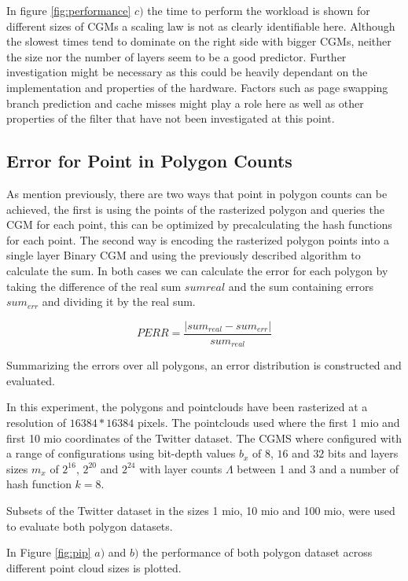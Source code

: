 \documentclass[sigconf, nonacm]{acmart}
\begin{document}
In figure \ref{fig:performance} $c)$ the time to perform the workload is shown for different sizes of CGMs a scaling law is not as clearly identifiable here. Although the slowest times tend to dominate on the right side with bigger CGMs, neither the size nor the number of layers seem to be a good predictor. Further investigation might be necessary as this could be heavily dependant on the implementation and properties of the hardware. Factors such as page swapping branch prediction and cache misses might play a role here as well as other properties of the filter that have not been investigated at this point.




\subsection{Error for Point in Polygon Counts}
\label{error-for-point-in-polygon-counts}

As mention previously, there are two ways that point in polygon counts can be achieved, the first is using the points of the rasterized polygon and queries the CGM for each point, this can be optimized by precalculating the hash functions for each point. The second way is encoding the rasterized polygon points into a single layer Binary CGM and using the previously described algorithm to calculate the sum. In both cases we can calculate the error for each polygon by taking the difference of the real sum $sum{real}$ and the sum containing errors
$sum_{err}$ and dividing it by the real sum.

$$PERR = \frac{|sum_{real} - sum_{err}|}{sum_{real }}$$

Summarizing the errors over all polygons, an error distribution is constructed and evaluated.

In this experiment, the polygons and pointclouds have been rasterized at a resolution of $16384*16384$ pixels. The pointclouds used where the first 1 mio and first 10 mio coordinates of the Twitter dataset. The CGMS where configured with a range of configurations using bit-depth values $b_x$ of $8$, $16$ and $32$ bits and layers sizes $m_x$ of $2^{16}$, $2^{20}$ and $2^{24}$ with layer counts $\Lambda$ between 1 and 3 and a number of hash function $k=8$.

Subsets of the Twitter dataset in the sizes 1 mio, 10 mio and 100 mio, were used to evaluate both polygon datasets.

In Figure \ref{fig:pip} $a)$ and $b)$ the performance of both polygon dataset across different point cloud sizes is plotted.
\end{document}
